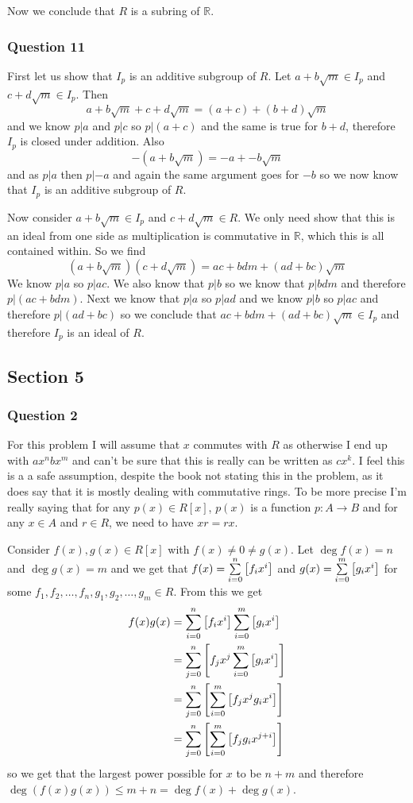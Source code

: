 \documentclass{article}
\begin{document}
Now we conclude that $R$ is a subring of $\mathbb R$.



\subsubsection{Question 11}
First let us show that $I_p$ is an additive subgroup of $R$. Let $a+b\sqrt m \in I_p$ and $c+d\sqrt m \in I_p$. Then $$a + b \sqrt m + c + d\sqrt m = (a+c)+(b+d)\sqrt m$$ and we know $p|a$ and $p|c$ so $p|(a+c)$ and the same is true for $b+d$, therefore $I_p$ is closed under addition. Also $$-\left(a+b\sqrt m\right) =-a+-b\sqrt m$$ and as $p|a$ then $p|-a$ and again the same argument goes for $-b$ so we now know that $I_p$ is an additive subgroup of $R$.

Now consider $a+b\sqrt m \in I_p$ and $c+d\sqrt m \in R$. We only need show that this is an ideal from one side as multiplication is commutative in $\mathbb R$, which this is all contained within. So we find $$
\left(a+b\sqrt m\right)\left(c+d\sqrt m\right)=ac+bdm + (ad+bc)\sqrt m $$ We know $p|a$ so $p|ac$. We also know that $p|b$ so we know that $p|bdm$ and therefore $p|(ac + bdm)$. Next we know that $p|a$ so $p|ad$ and we know $p|b$ so $p|ac$ and therefore $p|(ad+bc)$ so we conclude that $ac+bdm+(ad+bc)\sqrt m \in I_p$ and therefore $I_p$ is an ideal of $R$.

\subsection{Section 5}
\subsubsection{Question 2}

For this problem I will assume that $x$ commutes with $R$ as otherwise I end up with $ax^nbx^m$ and can't be sure that this is really can be written as $cx^k$. I feel this is a a safe assumption, despite the book not stating this in the problem, as it does say that it is mostly dealing with commutative rings. To be more precise I'm really saying that for any $p(x) \in R[x]$, $p(x)$ is a function $p:A\to B$ and for any $x\in A$ and $r \in R$, we need to have $xr = rx$.

 Consider $f(x), g(x) \in R[x]$ with $f(x)\not=0\not=g(x)$. Let $\deg f(x) = n$ and $\deg g(x) = m$ and we get that $f(x) = \sumfrom{i=0}{n}{f_ix^i}$ and $g(x) = \sumfrom{i=0}{m}{g_ix^i}$ for some $f_1,f_2,\ldots,f_n,g_1,g_2,\ldots,g_m \in R$. From this we get
\def\LB{\left[}
\def\RB{\right]}
\begin{align*}
f(x)g(x)&= \sumfrom{i=0}{n}{f_ix^i}\sumfrom{i=0}{m}{g_ix^i}\\
&= \sumfrom{j=0}n{f_jx^j\sumfrom{i=0}m{g_ix^i}}\\
&= \sumfrom{j=0}n{\sumfrom{i=0}m{f_jx^jg_ix^i}} \\
&= \sumfrom{j=0}n{\sumfrom{i=0}m{f_jg_ix^{j+i}}}
\end{align*}
so we get that the largest power possible for $x$ to be $n+m$ and therefore $\deg(f(x)g(x)) \le m+n = \deg f(x)+\deg g(x)$.
\end{document}
